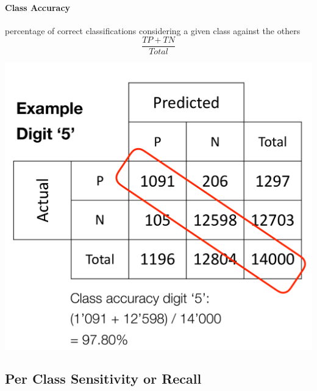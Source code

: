 \documentclass[11pt]{article}
\begin{document}
\begin{minipage}{0.5\textwidth}
	\paragraph{Class Accuracy} percentage of correct classifications considering a given class against the others
	\begin{equation*}
		\frac{TP + TN}{Total}
	\end{equation*}
\end{minipage}
\begin{minipage}{0.5\textwidth}
	\centering
	\includegraphics[width=0.8\linewidth,keepaspectratio]{class_accuracy}
\end{minipage}

\subsection{Per Class Sensitivity or Recall}
\end{document}

